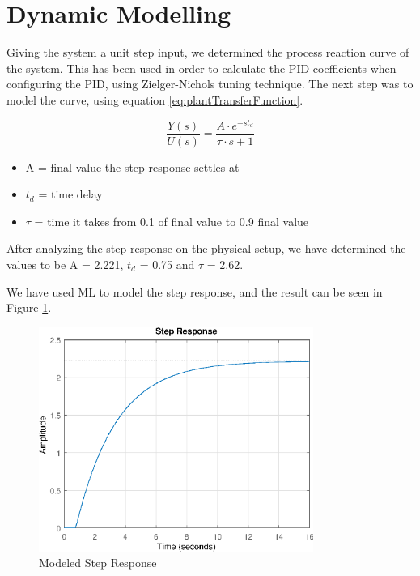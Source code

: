 {\section{Dynamic Modelling}
Giving the system a unit step input, we determined the process reaction curve of the system. This has been used 
in order to calculate the PID coefficients when configuring the PID, using Zielger-Nichols tuning technique.
The next step was to model the curve, using equation \ref{eq:plantTransferFunction}.

\begin{equation}
	\frac{Y(s)}{U(s)} = \frac{A \cdot e^{-st_d}}{\tau \cdot s + 1}
	\label{eq:plantTransferFunction}
\end{equation}

\begin{itemize}
	\item A = final value the step response settles at
	\item $t_{d}$ = time delay
	\item $\tau$ = time it takes from 0.1 of final value to 0.9 final value
\end{itemize}

After analyzing the step response on the physical setup, we have determined the values to be A = 2.221, 
$t_d$ = 0.75 and $\tau$ = 2.62.

We have used ML to model the step response, and the result can be seen in Figure \ref{fig:modeledStepResponse}.

\begin{figure}[ht]
	\centering
	\includegraphics[width=0.8\textwidth]{figures/06ModelValidation/modeledStepResponse.eps}
	\caption{Modeled Step Response}
	\label{fig:modeledStepResponse}
\end{figure}

}
